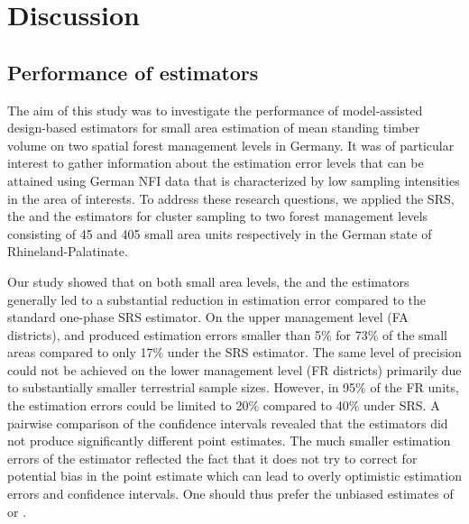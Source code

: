 \section{Discussion} %
\label{sec:Dis}

\subsection{Performance of estimators}

The aim of this study was to investigate the performance of model-assisted design-based estimators for small area estimation of mean standing timber volume on two spatial forest management levels in Germany. It was of particular interest to gather information about the estimation error levels that can be attained using German NFI data that is characterized by low sampling intensities in the area of interests. To address these research questions, we applied the SRS, the \psmall{} and the \extpsynth{} estimators for cluster sampling to two forest management levels consisting of 45 and 405 small area units respectively in the German state of Rhineland-Palatinate.\par

Our study showed that on both small area levels, the \psmall{} and the \extpsynth{} estimators generally led to a substantial reduction in estimation error compared to the standard one-phase SRS estimator. On the upper management level (FA districts), \psmall{} and \extpsynth{} produced estimation errors smaller than 5\% for 73\% of the small areas compared to only 17\% under the SRS estimator. The same level of precision could not be achieved on the lower management level (FR districts) primarily due to substantially smaller terrestrial sample sizes. However, in 95\% of the FR units, the estimation errors could be limited to 20\% compared to 40\% under SRS. A pairwise comparison of the confidence intervals revealed that the estimators did not produce significantly different point estimates. The much smaller estimation errors of the \psynth{} estimator 
reflected the fact that it does not try to correct for potential bias in the point estimate which can lead to overly optimistic estimation errors and confidence intervals. One should thus prefer the unbiased estimates of \psmall{} or \extpsynth{}.\par

